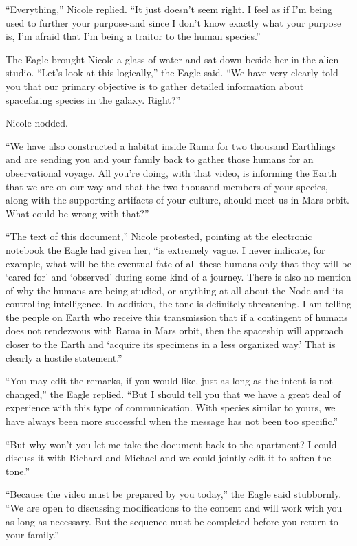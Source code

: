 \documentclass[]{article}
\begin{document}
{“Everything,” Nicole replied. “It just doesn’t seem right. I feel as if I’m being used to further your purpose-and since I don’t know exactly what your purpose is, I’m afraid that I’m being a traitor to the human species.”

The Eagle brought Nicole a glass of water and sat down beside her in the alien studio. “Let’s look at this logically,” the Eagle said. “We have very clearly told you that our primary objective is to gather detailed information about spacefaring species in the galaxy. Right?”

Nicole nodded.

“We have also constructed a habitat inside Rama for two thousand Earthlings and are sending you and your family back to gather those humans for an observational voyage. All you’re doing, with that video, is informing the Earth that we are on our way and that the two thousand members of your species, along with the supporting artifacts of your culture, should meet us in Mars orbit. What could be wrong with that?”

“The text of this document,” Nicole protested, pointing at the electronic notebook the Eagle had given her, “is extremely vague. I never indicate, for example, what will be the eventual fate of all these humans-only that they will be ‘cared for’ and ‘observed’ during some kind of a journey. There is also no mention of why the humans are being studied, or anything at all about the Node and its controlling intelligence. In addition, the tone is definitely threatening. I am telling the people on Earth who receive this transmission that if a contingent of humans does not rendezvous with Rama in Mars orbit, then the spaceship will approach closer to the Earth and ‘acquire its specimens in a less organized way.’ That is clearly a hostile statement.”

“You may edit the remarks, if you would like, just as long as the intent is not changed,” the Eagle replied. “But I should tell you that we have a great deal of experience with this type of communication. With species similar to yours, we have always been more successful when the message has not been too specific.”

“But why won’t you let me take the document back to the apartment? I could discuss it with Richard and Michael and we could jointly edit it to soften the tone.”

“Because the video must be prepared by you today,” the Eagle said stubbornly. “We are open to discussing modifications to the content and will work with you as long as necessary. But the sequence must be completed before you return to your family.”

}
\end{document}
